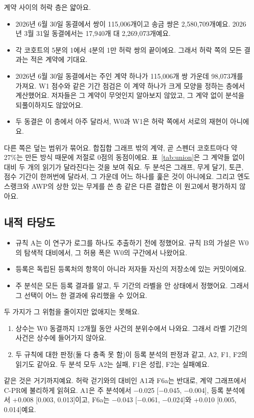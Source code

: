 계약 사이의 허락 층은 얇아요.
\begin{itemize}
\item 2026년 6월 30일 동결에서 쌍이 115,006개이고 송금 쌍은 2,580,709개예요. 2026년 3월 31일 동결에서는 17,940개 대 2,269,073개예요.
\item 각 코호트의 5분의 1에서 4분의 1만 허락 쌍의 끝이에요. 그래서 허락 쪽의 모든 결과는 적은 계약에 기대요.
\item 2026년 6월 30일 동결에서는 주인 계약 하나가 115,006개 쌍 가운데 98,073개를 가져요. W1 점수와 같은 기간 점검은 이 계약 하나가 크게 모양을 정하는 층에서 계산했어요. 저자들은 그 계약이 무엇인지 알아보지 않았고, 그 계약 없이 분석을 되풀이하지도 않았어요.
\item 두 동결은 이 층에서 아주 달라서, W0과 W1은 허락 쪽에서 서로의 재현이 아니에요.
\end{itemize}
다른 쪽은 덮는 범위가 묶어요. 합집합 그래프 밖의 계약, 곧 스펜더 코호트마다 약 27\%는 만든 방식 때문에 저절로 0점의 동점이에요. 표~\ref{tab:union}은 그 계약들 없이 대비 두 개의 읽기가 달라진다는 것을 보여 줘요. 두 분석은 그래프, 무게 달기, 토큰, 점수 기간이 한꺼번에 달라서, 그 가운데 어느 하나를 훑은 것이 아니에요. 그리고 엔도스랭크와 AWP의 상한 있는 무게를 쓴 층 같은 다른 결합은 이 원고에서 평가하지 않아요.

\subsection{내적 타당도}

\begin{itemize}
\item 규칙 A는 이 연구가 로그를 하나도 추출하기 전에 정했어요. 규칙 B의 가설은 W0의 탐색적 대비에서, 그 허용 폭은 W0의 구간에서 나왔어요.
\item 등록은 독립된 등록처의 항목이 아니라 저자들 자신의 저장소에 있는 커밋이에요.
\item 주 분석은 모든 등록 결과를 알고, 두 기간의 라벨을 안 상태에서 정했어요. 그래서 그 선택이 어느 한 결과에 유리했을 수 있어요.
\end{itemize}
두 가지가 그 위험을 줄이지만 없애지는 못해요.
\begin{enumerate}
\item 상수는 W0 동결까지 12개월 동안 사건의 분위수에서 나와요. 그래서 라벨 기간의 사건은 상수에 들어가지 않아요.
\item 두 규칙에 대한 판정(둘 다 충족 못 함)이 등록 분석의 판정과 같고, A2, F1, F2의 읽기도 같아요. 두 분석 모두 A2는 실패, F1은 성립, F2는 실패예요.
\end{enumerate}
같은 것은 거기까지예요. 허락 걷기와의 대비인 A1과 F6a는 반대로, 계약 그래프에서 C-PR에 불리하게 읽혀요. A1은 주 분석에서 −0.025 [−0.045, −0.004], 등록 분석에서 +0.008 [0.003, 0.013]이고, F6a는 −0.043 [−0.061, −0.024]와 +0.010 [0.005, 0.014]예요.

